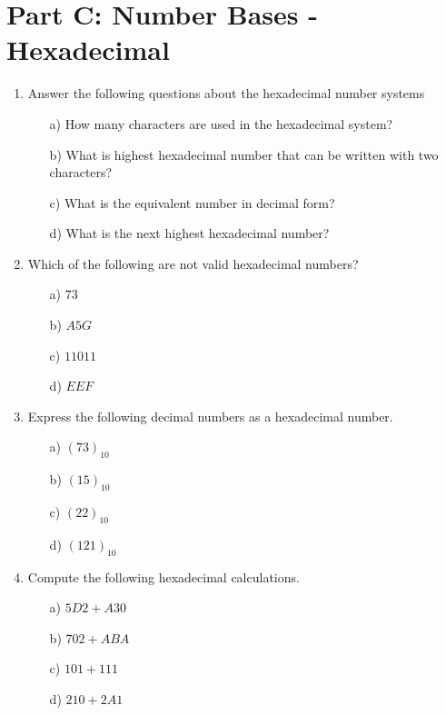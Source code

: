 \documentclass[]{report}
\begin{document}
\section*{Part C: Number Bases - Hexadecimal}
\begin{enumerate}

\item Answer the following questions about the hexadecimal number systems
\begin{itemize}
\item[a)] How many characters are used in the hexadecimal system?
\item[b)] What is highest hexadecimal number that can be written with two characters? \item[c)] What is the equivalent number in decimal form?
\item[d)] What is the next highest hexadecimal number?
\end{itemize}


\item Which of the following are not valid hexadecimal numbers?
  \begin{multicols}{4}
    \begin{itemize}
    \item[a)] $73$
    \item[b)] $A5G$
    \item[c)] $11011$
    \item[d)] $EEF	$
    \end{itemize}
  \end{multicols}

\item Express the following decimal numbers as a hexadecimal number.
  \begin{multicols}{4}
    \begin{itemize}
    \item[a)] $(73)_{10}$
    \item[b)] $(15)_{10}$
    \item[c)] $(22)_{10}$
    \item[d)] $(121)_{10}$
    \end{itemize}
  \end{multicols}


\item Compute the following hexadecimal calculations.
  \begin{multicols}{4}
    \begin{itemize}
    \item[a)] $5D2+A30$
    \item[b)] $702+ABA$
    \item[c)] $101+111$
    \item[d)] $210+2A1$
    \end{itemize}
  \end{multicols}
\end{enumerate}
\end{document}
